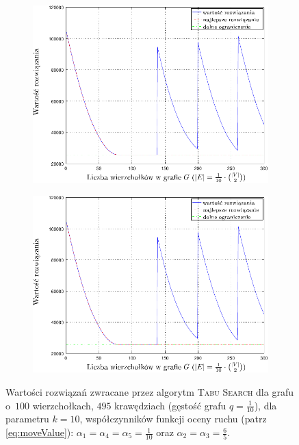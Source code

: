 \begin{figure}[!htbp]
	\renewcommand\figurename{Wykres}
	\ContinuedFloat
	\null\hfill
	\begin{subfigure}[b]{0.45\textwidth}
		\includegraphics[width=\textwidth]{Chapter_VI/RRIMST3-example/RRIMST3_psfrag}
		\caption{}
		\label{fig:rrimst1:c}
	\end{subfigure}
	\hfill
	\begin{subfigure}[b]{0.45\textwidth}
		\includegraphics[width=\textwidth]{Chapter_VI/RRIMST4-example/RRIMST4_psfrag}
		\caption{}
		\label{fig:rrimst1:d}
	\end{subfigure}
	\hfill\null
	\caption{
		Wartości rozwiązań zwracane przez algorytm \textsc{Tabu Search} dla grafu o~$100$ wierzchołkach, $495$ krawędziach (gęstość grafu $q = \frac{1}{10}$), dla parametru $k = 10$, współczynników funkcji oceny ruchu (patrz \ref{eq:moveValue}): $\alpha_{1} = \alpha_{4} = \alpha_{5} = \frac{1}{10}$ oraz $\alpha_{2} = \alpha_{3} = \frac{6}{5}$.
}
\end{figure}
